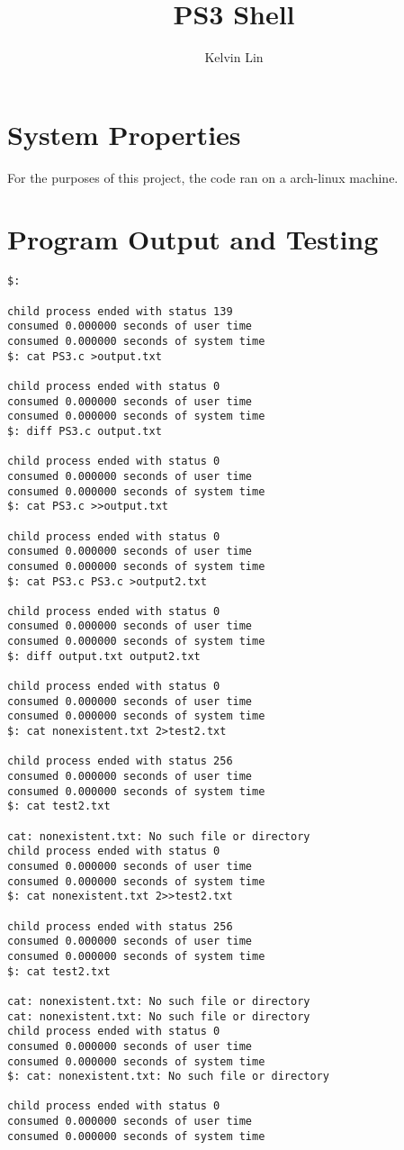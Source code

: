 \documentclass[12pt]{article}
\title{PS3 Shell}
\author{Kelvin Lin}
\begin{document}
\maketitle

\section{System Properties}
For the purposes of this project, the code ran on a arch-linux machine.

\section{Program Output and Testing}

\begin{lstlisting}
$: 

child process ended with status 139
consumed 0.000000 seconds of user time 
consumed 0.000000 seconds of system time
$: cat PS3.c >output.txt

child process ended with status 0
consumed 0.000000 seconds of user time 
consumed 0.000000 seconds of system time
$: diff PS3.c output.txt

child process ended with status 0
consumed 0.000000 seconds of user time 
consumed 0.000000 seconds of system time
$: cat PS3.c >>output.txt

child process ended with status 0
consumed 0.000000 seconds of user time 
consumed 0.000000 seconds of system time
$: cat PS3.c PS3.c >output2.txt

child process ended with status 0
consumed 0.000000 seconds of user time 
consumed 0.000000 seconds of system time
$: diff output.txt output2.txt

child process ended with status 0
consumed 0.000000 seconds of user time 
consumed 0.000000 seconds of system time
$: cat nonexistent.txt 2>test2.txt

child process ended with status 256
consumed 0.000000 seconds of user time 
consumed 0.000000 seconds of system time
$: cat test2.txt

cat: nonexistent.txt: No such file or directory
child process ended with status 0
consumed 0.000000 seconds of user time 
consumed 0.000000 seconds of system time
$: cat nonexistent.txt 2>>test2.txt

child process ended with status 256
consumed 0.000000 seconds of user time 
consumed 0.000000 seconds of system time
$: cat test2.txt

cat: nonexistent.txt: No such file or directory
cat: nonexistent.txt: No such file or directory
child process ended with status 0
consumed 0.000000 seconds of user time 
consumed 0.000000 seconds of system time
$: cat: nonexistent.txt: No such file or directory

child process ended with status 0
consumed 0.000000 seconds of user time 
consumed 0.000000 seconds of system time

\end{lstlisting}
\end{document}
